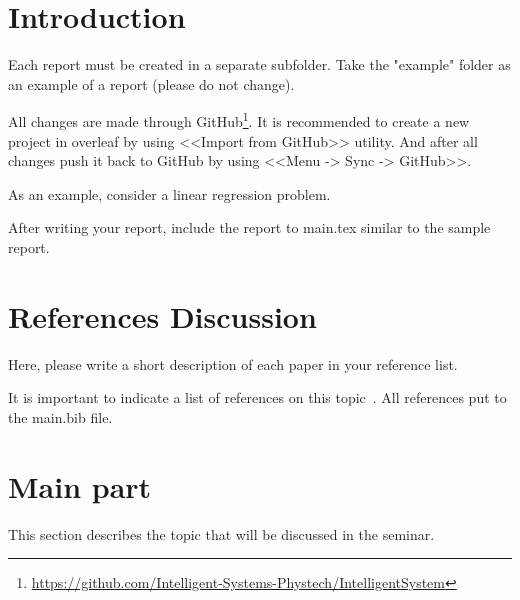\section{Introduction}

Each report must be created in a separate subfolder. Take the "example" folder as an example of a report (please do not change).

All changes are made through GitHub\footnote{\url{https://github.com/Intelligent-Systems-Phystech/IntelligentSystem}}. It is recommended to create a new project in overleaf by using <<Import from GitHub>> utility. And after all changes push it back to GitHub by using <<Menu -> Sync -> GitHub>>.

As an example, consider a linear regression problem.


After writing your report, include the report to main.tex similar to the sample report.

\section{References Discussion}

Here, please write a short description of each paper in your reference list.

It is important to indicate a list of references on this topic~\cite{AuthorYear}. All references put to the main.bib file.


\section{Main part}

This section describes the topic that will be discussed in the seminar.